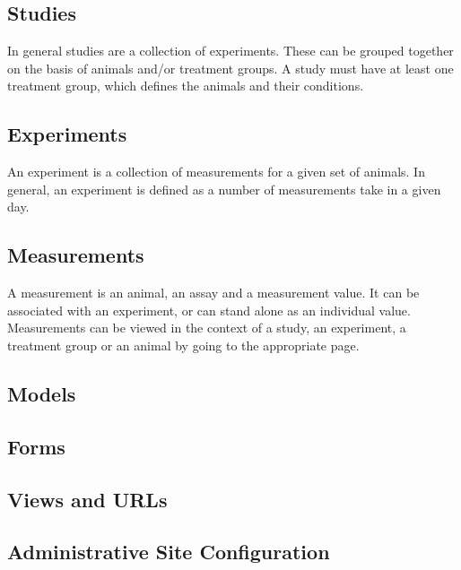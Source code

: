 \documentclass[letterpaper,10pt,english]{sphinxmanual}
\begin{document}
\subsection{Studies}
\label{api:studies}
In general studies are a collection of experiments.  These can be grouped together on the basis of animals and/or treatment groups.  A study must have at least one treatment group, which defines the animals and their conditions.



\subsection{Experiments}
\label{api:experiments}
An experiment is a collection of measurements for a given set of animals.  In general, an experiment is defined as a number of measurements take in a given day.



\subsection{Measurements}
\label{api:measurements}
A measurement is an animal, an assay and a measurement value.  It can be associated with an experiment, or can stand alone as an individual value.  Measurements can be viewed in the context of a study, an experiment, a treatment group or an animal by going to the appropriate page.



\subsection{Models}
\label{api:models}

\subsection{Forms}
\label{api:forms}

\subsection{Views and URLs}
\label{api:views-and-urls}\label{api:module-data.urls}

\subsection{Administrative Site Configuration}
\label{api:administrative-site-configuration}
\end{document}
